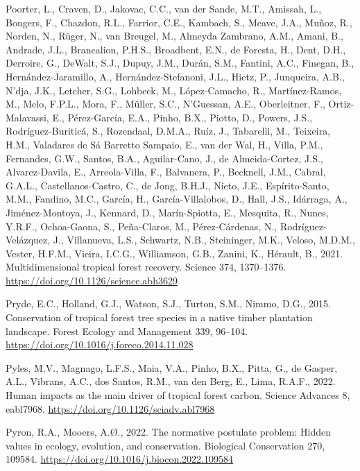 \documentclass[
  12pt,
]{article}
\newlength{\cslhangindent}
\newlength{\cslentryspacingunit} %
\newenvironment{CSLReferences}[2] %
 {%
  \setlength{\parindent}{0pt}
  \ifodd #1
  \let\oldpar\par
  \def\par{\hangindent=\cslhangindent\oldpar}
  \fi
  \setlength{\parskip}{#2\cslentryspacingunit}
 }%
 {}
\begin{document}
\begin{CSLReferences}{1}{0}
\leavevmode{}%
Poorter, L., Craven, D., Jakovac, C.C., van der Sande, M.T., Amissah, L., Bongers, F., Chazdon, R.L., Farrior, C.E., Kambach, S., Meave, J.A., Muñoz, R., Norden, N., Rüger, N., van Breugel, M., Almeyda Zambrano, A.M., Amani, B., Andrade, J.L., Brancalion, P.H.S., Broadbent, E.N., de Foresta, H., Dent, D.H., Derroire, G., DeWalt, S.J., Dupuy, J.M., Durán, S.M., Fantini, A.C., Finegan, B., Hernández-Jaramillo, A., Hernández-Stefanoni, J.L., Hietz, P., Junqueira, A.B., N'dja, J.K., Letcher, S.G., Lohbeck, M., López-Camacho, R., Martínez-Ramos, M., Melo, F.P.L., Mora, F., Müller, S.C., N'Guessan, A.E., Oberleitner, F., Ortiz-Malavassi, E., Pérez-García, E.A., Pinho, B.X., Piotto, D., Powers, J.S., Rodríguez-Buriticá, S., Rozendaal, D.M.A., Ruíz, J., Tabarelli, M., Teixeira, H.M., Valadares de Sá Barretto Sampaio, E., van der Wal, H., Villa, P.M., Fernandes, G.W., Santos, B.A., Aguilar-Cano, J., de Almeida-Cortez, J.S., Alvarez-Davila, E., Arreola-Villa, F., Balvanera, P., Becknell, J.M., Cabral, G.A.L., Castellanos-Castro, C., de Jong, B.H.J., Nieto, J.E., Espírito-Santo, M.M., Fandino, M.C., García, H., García-Villalobos, D., Hall, J.S., Idárraga, A., Jiménez-Montoya, J., Kennard, D., Marín-Spiotta, E., Mesquita, R., Nunes, Y.R.F., Ochoa-Gaona, S., Peña-Claros, M., Pérez-Cárdenas, N., Rodríguez-Velázquez, J., Villanueva, L.S., Schwartz, N.B., Steininger, M.K., Veloso, M.D.M., Vester, H.F.M., Vieira, I.C.G., Williamson, G.B., Zanini, K., Hérault, B., 2021. Multidimensional tropical forest recovery. Science 374, 1370--1376. \url{https://doi.org/10.1126/science.abh3629}

\leavevmode{}%
Pryde, E.C., Holland, G.J., Watson, S.J., Turton, S.M., Nimmo, D.G., 2015. Conservation of tropical forest tree species in a native timber plantation landscape. Forest Ecology and Management 339, 96--104. \url{https://doi.org/10.1016/j.foreco.2014.11.028}

\leavevmode{}%
Pyles, M.V., Magnago, L.F.S., Maia, V.A., Pinho, B.X., Pitta, G., de Gasper, A.L., Vibrans, A.C., dos Santos, R.M., van den Berg, E., Lima, R.A.F., 2022. Human impacts as the main driver of tropical forest carbon. Science Advances 8, eabl7968. \url{https://doi.org/10.1126/sciadv.abl7968}

\leavevmode{}%
Pyron, R.A., Mooers, A.Ø., 2022. The normative postulate problem: {Hidden} values in ecology, evolution, and conservation. Biological Conservation 270, 109584. \url{https://doi.org/10.1016/j.biocon.2022.109584}


\end{CSLReferences}
\end{document}
